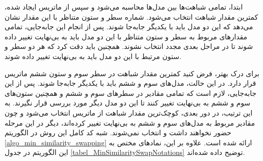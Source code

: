 ابتدا، تمامی شباهت‌ها بین مدل‌ها محاسبه می‌شود و سپس از ماتریس ایجاد شده، کمترین مقدار شباهت انتخاب می‌شود. شماره سطر و ستون متناظر با این مقدار نشان می‌دهد که این دو مدل باید با یکدیگر جابه‌جا شوند. پس از انجام این جابه‌جایی، تمامی مقدارهای مربوط به سطر و ستون متناظر با این دو مدل باید به بی‌نهایت تغییر داده شوند تا در مراحل بعدی مجدد انتخاب نشوند. همچنین باید دقت کرد که هر دو سطر و ستون مرتبط با این دو مدل باید به بی‌نهایت تغییر داده شوند.

برای درک بهتر، فرض کنید کمترین مقدار شباهت در سطر سوم و ستون ششم ماتریس قرار دارد. در این حالت، مدل‌های سوم و ششم باید با یکدیگر جابه‌جا شوند. پس از این جابه‌جایی، لازم است که تمامی مقادیر در سطرهای سوم و ششم و همچنین ستون‌های سوم و ششم به بی‌نهایت تغییر کنند تا این دو مدل دیگر مورد بررسی قرار نگیرند. به این ترتیب، در دور بعدی، کوچک‌ترین مقدار شباهت از ماتریس انتخاب می‌شود و چون مقادیر مربوط به مدل‌های سوم و ششم به بی‌نهایت تغییر کرده‌اند، دیگر در این مرحله حضور نخواهند داشت و انتخاب نمی‌شوند. شبه کد کامل این روش در الگوریتم
\ref{algo_min_similarity_swapping}
ارائه شده است. علاوه بر این، نمادهای مختص به این الگوریتم در جدول
\ref{tabel_MinSimilaritySwapNotations}
توضیح داده شده‌اند.


\begin{LTR}
	\begin{algorithm}[t]
		\begin{RTL}
			\caption{%
				جابه‌جایی حداقل شباهت
			}
			\label{algo_min_similarity_swapping}
		\end{RTL}
		
		\begin{latin}
		\end{latin}
	\end{algorithm}
\end{LTR}


